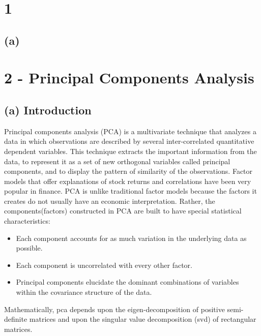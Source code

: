 \documentclass[12pt,twoside]{article}
\begin{document}

\section*{1}
\subsection*{(a)}

\section*{2 - Principal Components Analysis}
\subsection*{(a) Introduction}
Principal components analysis (PCA) is a multivariate technique that analyzes a data in which observations are described by several inter-correlated quantitative dependent variables. This technique extracts the important information from the data, to represent it as a set of new orthogonal variables called principal components, and to display the pattern of similarity of the observations.
\bigbreak
Factor models that offer explanations of stock returns and correlations have been very popular in finance. PCA is unlike traditional factor models because the factors it creates do not usually have an economic interpretation. Rather, the components(factors) constructed in PCA are built to have special statistical characteristics: 
\begin{itemize}
\item Each component accounts for as much variation in the underlying data as possible.
\item Each component is uncorrelated with every other factor.
\item Principal components elucidate the dominant combinations of variables within the covariance
structure of the data.
\end{itemize}

Mathematically, pca depends upon the eigen-decomposition of positive semi-definite matrices and upon the singular value decomposition (svd) of rectangular matrices.
\end{document}
